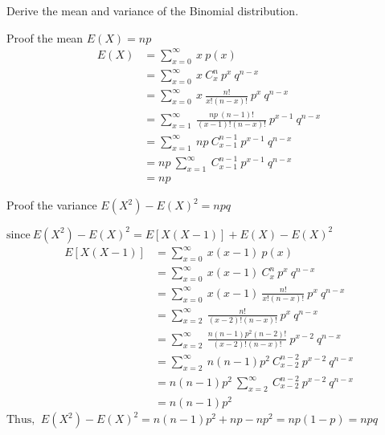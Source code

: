 Derive the mean and variance of the Binomial distribution.

    Proof the mean $E(X) = np$
        \begin{align*}
            E(X) &= \sum_{x=0}^{\infty}\ x\ p(x) \\
            &= \sum_{x=0}^{\infty}\ x\ C_{x}^{n}\ p^{x}\ q^{n-x} \\
            &= \sum_{x=0}^{\infty}\ x\ \frac{n!}{x!(n-x)!}\ p^{x}\ q^{n-x} \\
            &= \sum_{x=1}^{\infty}\ \frac{np \ (n-1)!}{(x-1)!(n-x)!}\ p^{x-1}\ q^{n-x} \\
            &= \sum_{x=1}^{\infty}\  np\ C_{x-1}^{n-1}\ p^{x-1}\ q^{n-x} \\
            &= np\ \sum_{x=1}^{\infty}\  C_{x-1}^{n-1}\ p^{x-1}\ q^{n-x} \\
            &= np 
        \end{align*}

    Proof the variance $E(X^2) - E(X)^2 = npq$
        
        $\text{since}\  E(X^2) - E(X)^2 = E[X(X-1)] + E(X) - E(X)^2$
        \begin{align*}
            E[X(X-1)] &= \sum_{x=0}^{\infty}\ x(x-1)\ p(x)\\
            &= \sum_{x=0}^{\infty}\ x(x-1)\ C_{x}^{n}\ p^{x}\ q^{n-x} \\
            &= \sum_{x=0}^{\infty}\ x(x-1)\ \frac{n!}{x!(n-x)!}\ p^{x}\ q^{n-x} \\
            &= \sum_{x=2}^{\infty}\ \frac{n!}{(x-2)!(n-x)!}\ p^{x}\ q^{n-x} \\
            &= \sum_{x=2}^{\infty}\ \frac{n(n-1)p^2(n-2)!}{(x-2)!(n-x)!}\ p^{x-2}\ q^{n-x} \\
            &= \sum_{x=2}^{\infty}\ n(n-1)p^2\ C_{x-2}^{n-2}\ p^{x-2}\ q^{n-x} \\
            &= n(n-1)p^2\ \sum_{x=2}^{\infty}\ C_{x-2}^{n-2}\ p^{x-2}\ q^{n-x} \\
            &= n(n-1)p^2
        \end{align*}
        $\text{Thus, }\ E(X^2) - E(X)^2 = n(n-1)p^2 + np - np^2 = np(1-p) = npq$